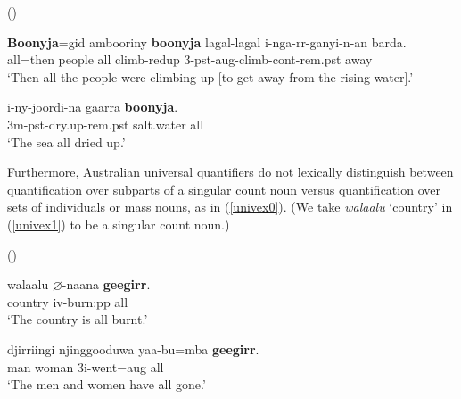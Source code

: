 \documentclass[12pt,egregdoesnotlikesansseriftitles]{scrartcl}
\begin{document}
\begin{exe}
 (\citealt{bowern12}) \label{univmasscount1}
\begin{xlist}
\ex %
\gll \textbf{Boonyja}=gid ambooriny \textbf{boonyja} lagal-lagal   i-nga-rr-ganyi-n-an barda.\\
all={\sc then} people all climb-{\sc redup}  3-{\sc pst-aug}-climb-{\sc cont-rem.pst} away\\
`Then all the people were climbing up [to get away from the rising water].'\label{univmasscount2}

\ex \gll i-ny-joordi-na gaarra \textbf{boonyja}.\\
3{\sc m-pst}-dry.up-{\sc rem.pst} salt.water all\\
`The sea all dried up.'\label{univmasscount3} %
\end{xlist}
\end{exe}


Furthermore,  Australian universal quantifiers do not lexically distinguish between quantification  over subparts of a singular count noun versus quantification over sets of individuals or mass nouns, as in (\ref{univex0}). (We take \textit{walaalu} `country' in (\ref{univex1}) to be a singular count noun.)



\begin{exe}
  (\citealt[307]{harvey92}) \label{univex0}
  \begin{xlist}
      \ex \gll walaalu $\varnothing$-naana \textbf{geegirr}.\\
    country {\sc iv}-burn:{\sc pp} all\\
    \glt `The country is all burnt.' \label{univex1}
    
    \ex \gll djirriingi njinggooduwa yaa-bu=mba \textbf{geegirr}.\\
    man woman 3{\sc i}-went={\sc aug} all\\
    \glt `The men and women have all gone.' \label{univex2}
  \end{xlist}
\end{exe}
\end{document}
